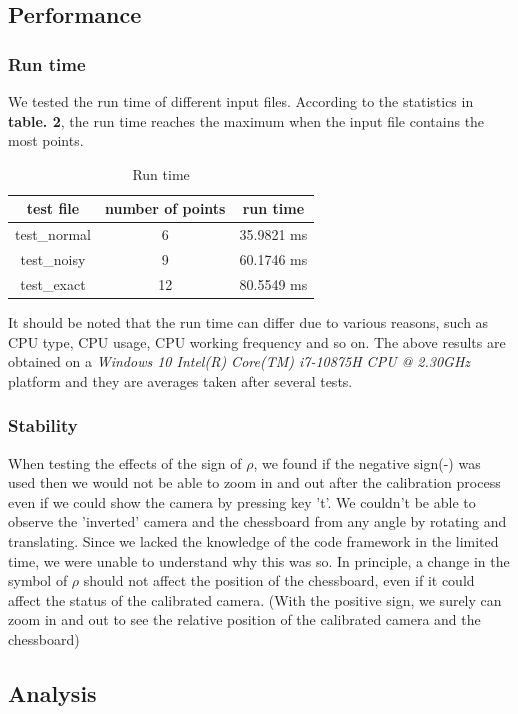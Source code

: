 \documentclass[a4paper]{article}
\begin{document}
\subsection{Performance}
\subsubsection{\small Run time}
We tested the run time of different input files. According to the statistics in \textbf{table. 2}, the run time reaches the maximum when the input file contains the most points.

\begin{table}[h]\centering
\begin{tabular}{ |c|c|c| } 
 \hline
 test file & number of points & run time \\ 
 \hline
 test\_normal & 6 & 35.9821 ms\\ 
 \hline
 test\_noisy & 9 & 60.1746 ms\\ 
 \hline
 test\_exact & 12 & 80.5549 ms\\ 
 \hline
\end{tabular}
\caption{Run time}
\end{table}

It should be noted that the run time can differ due to various reasons, such as CPU type, CPU usage, CPU working frequency and so on. The above results are obtained on a \textit{Windows 10 Intel(R) Core(TM) i7-10875H CPU @ 2.30GHz} platform and they are averages taken after several tests.

\subsubsection{\small Stability}
When testing the effects of the sign of $\rho$, we found if the negative sign(-) was used then we would not be able to zoom in and out after the calibration process even if we could show the camera by pressing key 't'. We couldn't be able to observe the 'inverted' camera and the chessboard from any angle by rotating and translating. Since we lacked the knowledge of the code framework in the limited time, we were unable to understand why this was so. In principle, a change in the symbol of $\rho$ should not affect the position of the chessboard, even if it could affect the status of the calibrated camera. (With the positive sign, we surely can zoom in and out to see the relative position of the calibrated camera and the chessboard)

\subsection{Analysis}
\end{document}
